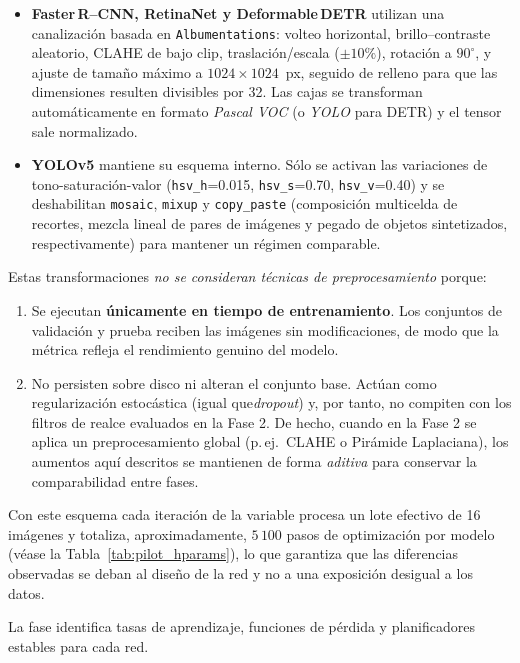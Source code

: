 \begin{itemize}
    \item \textbf{Faster\,R--CNN, RetinaNet y Deformable\,DETR} utilizan una canalización basada en \texttt{Albumentations}:
    volteo horizontal, brillo–contraste aleatorio, CLAHE de bajo clip, traslación/escala (\(\pm 10\%\)), rotación a \(90^{\circ}\),
    y ajuste de tamaño máximo a \(1024\times1024\)~px, seguido de relleno para que las dimensiones resulten divisibles por 32.
    Las cajas se transforman automáticamente en formato \textit{Pascal VOC} (o \textit{YOLO} para DETR) y el tensor sale normalizado.
    \item \textbf{YOLOv5} mantiene su esquema interno.
    Sólo se activan las variaciones de tono-saturación-valor (\texttt{hsv\_h}=0.015, \texttt{hsv\_s}=0.70, \texttt{hsv\_v}=0.40) y se deshabilitan \texttt{mosaic}, \texttt{mixup} y \texttt{copy\_paste} (composición multicelda de recortes, mezcla lineal de pares de imágenes y pegado de objetos sintetizados, respectivamente) para mantener un régimen comparable.
\end{itemize}

Estas transformaciones \emph{no se consideran técnicas de preprocesamiento} porque:

\begin{enumerate}
    \item Se ejecutan \textbf{únicamente en tiempo de entrenamiento}.
    Los conjuntos de validación y prueba reciben las imágenes sin modificaciones, de modo que la métrica refleja el rendimiento genuino del modelo.
    \item No persisten sobre disco ni alteran el conjunto base.
    Actúan como regularización estocástica (igual que\textit{dropout}) y, por tanto, no compiten con los filtros de realce evaluados en la Fase 2.
    De hecho, cuando en la Fase 2 se aplica un preprocesamiento global (p.\,ej.\ CLAHE o Pirámide Laplaciana), los aumentos aquí descritos se mantienen de forma \textit{aditiva} para conservar la comparabilidad entre fases.
\end{enumerate}

Con este esquema cada iteración de la variable procesa un lote efectivo de 16 imágenes y totaliza, aproximadamente, \(5\,100\) pasos de optimización por modelo (véase la Tabla~\ref{tab:pilot_hparams}), lo que garantiza que las diferencias observadas se deban al diseño de la red y no a una exposición desigual a los datos.

La fase identifica tasas de aprendizaje, funciones de pérdida y planificadores estables para cada red.

